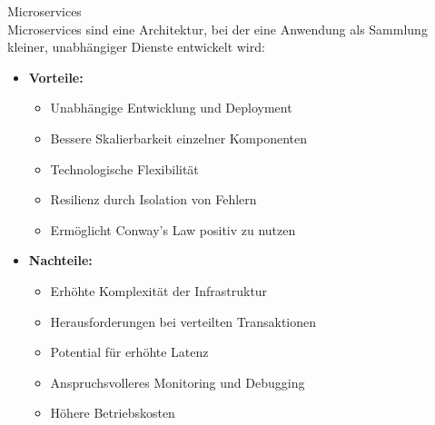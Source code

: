 \begin{concept}{Microservices}\\
    Microservices sind eine Architektur, bei der eine Anwendung als Sammlung kleiner, unabhängiger Dienste entwickelt wird:
    \begin{itemize}
        \item \textbf{Vorteile:}
        \begin{itemize}
            \item Unabhängige Entwicklung und Deployment
            \item Bessere Skalierbarkeit einzelner Komponenten
            \item Technologische Flexibilität
            \item Resilienz durch Isolation von Fehlern
            \item Ermöglicht Conway's Law positiv zu nutzen
        \end{itemize}
        
        \item \textbf{Nachteile:}
        \begin{itemize}
            \item Erhöhte Komplexität der Infrastruktur
            \item Herausforderungen bei verteilten Transaktionen
            \item Potential für erhöhte Latenz
            \item Anspruchsvolleres Monitoring und Debugging
            \item Höhere Betriebskosten
        \end{itemize}
    \end{itemize}
\end{concept}

